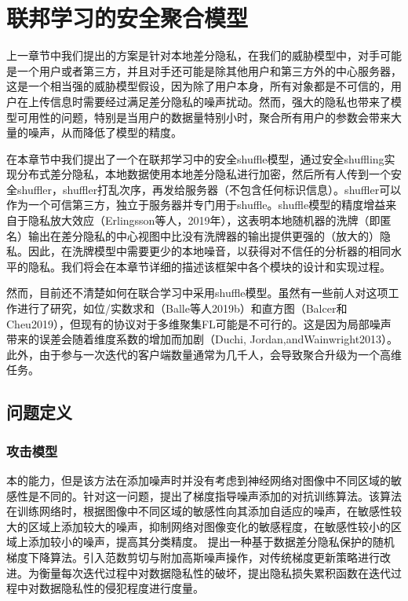 \chapter{联邦学习的安全聚合模型}
\label{ch4}

上一章节中我们提出的方案是针对本地差分隐私，在我们的威胁模型中，对手可能是一个用户或者第三方，并且对手还可能是除其他用户和第三方外的中心服务器，这是一个相当强的威胁模型假设，因为除了用户本身，所有对象都是不可信的，用户在上传信息时需要经过满足差分隐私的噪声扰动。然而，强大的隐私也带来了模型可用性的问题，特别是当用户的数据量特别小时，聚合所有用户的参数会带来大量的噪声，从而降低了模型的精度。

在本章节中我们提出了一个在联邦学习中的安全shuffle模型，通过安全shuffling实现分布式差分隐私，本地数据使用本地差分隐私进行加密，然后所有人传到一个安全shuffler，shuffler打乱次序，再发给服务器（不包含任何标识信息）。shuffler可以作为一个可信第三方，独立于服务器并专门用于shuffle。shuffle模型的精度增益来自于隐私放大效应（Erlingsson等人，2019年），这表明本地随机器的洗牌（即匿名）输出在差分隐私的中心视图中比没有洗牌器的输出提供更强的（放大的）隐私。因此，在洗牌模型中需要更少的本地噪音，以获得对不信任的分析器的相同水平的隐私。我们将会在本章节详细的描述该框架中各个模块的设计和实现过程。

然而，目前还不清楚如何在联合学习中采用shuffle模型。虽然有一些前人对这项工作进行了研究，如位/实数求和（Balle等人2019b）和直方图（Balcer和Cheu2019），但现有的协议对于多维聚集FL可能是不可行的。这是因为局部噪声带来的误差会随着维度系数的增加而加剧（Duchi, Jordan,andWainwright2013）。此外，由于参与一次迭代的客户端数量通常为几千人，会导致聚合升级为一个高维任务。

\section{问题定义}
\subsection{攻击模型}
本的能力，但是该方法在添加噪声时并没有考虑到神经网络对图像中不同区域的敏感性是不同的。针对这一问题，提出了梯度指导噪声添加的对抗训练算法。该算法在训练网络时，根据图像中不同区域的敏感性向其添加自适应的噪声，在敏感性较大的区域上添加较大的噪声，抑制网络对图像变化的敏感程度，在敏感性较小的区域上添加较小的噪声，提高其分类精度。
提出一种基于数据差分隐私保护的随机梯度下降算法。引入范数剪切与附加高斯噪声操作，对传统梯度更新策略进行改进。为衡量每次迭代过程中对数据隐私性的破坏，提出隐私损失累积函数在迭代过程中对数据隐私性的侵犯程度进行度量。

